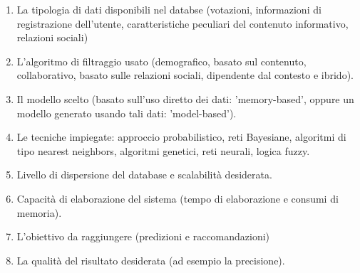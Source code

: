 \documentclass[11pt]{article}
\begin{document}
\begin{enumerate}
\item La tipologia di dati disponibili nel databse (votazioni, informazioni di registrazione dell'utente, caratteristiche peculiari del contenuto informativo, relazioni sociali)
\item L'algoritmo di filtraggio usato (demografico, basato sul contenuto, collaborativo, basato sulle relazioni sociali, dipendente dal contesto e ibrido).
\item Il modello scelto (basato sull'uso diretto dei dati: 'memory-based', oppure un modello generato usando tali dati: 'model-based').
\item Le tecniche impiegate: approccio probabilistico, reti Bayesiane, algoritmi di tipo nearest neighbors, algoritmi genetici, reti neurali, logica fuzzy.
\item Livello di dispersione del database e scalabilità desiderata.
\item Capacità di elaborazione del sistema (tempo di elaborazione e consumi di memoria).
\item L'obiettivo da raggiungere (predizioni e raccomandazioni)
\item La qualità del risultato desiderata (ad esempio la precisione).
\end{enumerate}
\end{document}
